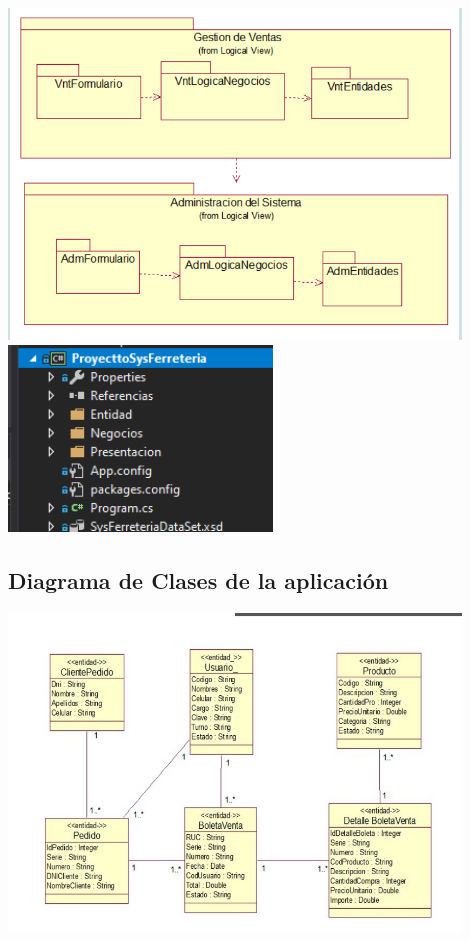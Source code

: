 \documentclass[preprint,12pt]{elsarticle}
\begin{document}
	\begin{center}
	\includegraphics[width=12cm]{./imagen/vistalogica} 
\includegraphics[width=7cm]{./imagen/3capas} 
	\end{center}
\subsection{\textbf{ Diagrama de Clases de la aplicación }}
\begin{center}
	\includegraphics[width=12cm]{./imagen/diagrmclasesvistaprocesos} 
	
	\end{center}
\end{document}
